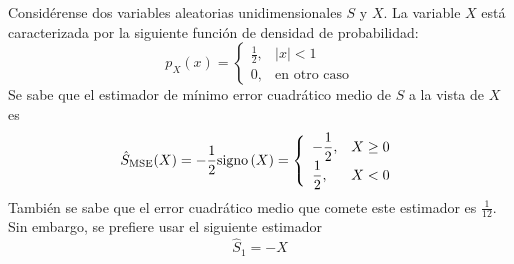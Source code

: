 \ifspanish

\question Considérense dos variables aleatorias unidimensionales $S$ y $X$. La variable $X$ está caracterizada por la siguiente función de densidad de probabilidad:
 $$p_X(x) =  \left\{\begin{array}{ll}
						  	\displaystyle
								  \frac{1}{2}, & |x|<1 \\
	  							  0, & {\mbox{en otro caso}} 
	 					 \end{array} 
						  \right. $$   
Se sabe que el estimador de mínimo error cuadrático medio de $S$ a la vista de $X$ es
 $$\hat{S}_\text{MSE}(X)= - \frac{1}{2} \mbox{signo}\left(X \right)   =  \left\{\begin{array}{ll}
						  	\displaystyle
								 - \frac{1}{2}, & X \geq 0 \\
	  							 \displaystyle\frac{1}{2}, & X< 0
	 					 \end{array} 
						  \right. $$   
También se sabe que el error cuadrático medio que comete este estimador es $\displaystyle\frac{1}{12}$. Sin embargo, se prefiere usar el siguiente estimador
 $$\hat{S}_1=-X$$

\begin{solution}
\end{solution}

